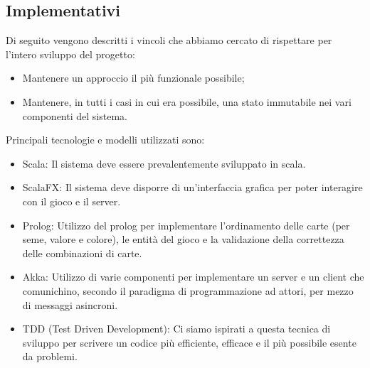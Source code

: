 \subsection{Implementativi}
Di seguito vengono descritti i vincoli che abbiamo cercato di rispettare per l’intero sviluppo del progetto:
\begin{itemize}
    \item Mantenere un approccio il più funzionale possibile;
    \item Mantenere, in tutti i casi in cui era possibile, una stato immutabile nei vari componenti del sistema.
\end{itemize}
Principali tecnologie e modelli utilizzati sono:
\begin{itemize}
    \item Scala: Il sistema deve essere prevalentemente sviluppato in scala.
    \item ScalaFX: Il sistema deve disporre di un’interfaccia grafica per poter interagire con il gioco e il server.
    \item Prolog: Utilizzo del prolog per implementare l’ordinamento delle carte (per seme, valore e colore), le entità del gioco e la validazione della correttezza delle combinazioni di carte.
    \item Akka: Utilizzo di varie componenti per implementare un server e un client che comunichino, secondo il paradigma di programmazione ad attori, per mezzo di messaggi asincroni.
    \item TDD (Test Driven Development): Ci siamo ispirati a questa tecnica di sviluppo per scrivere un codice più efficiente, efficace e il più possibile esente da problemi.
\end{itemize}
\newpage